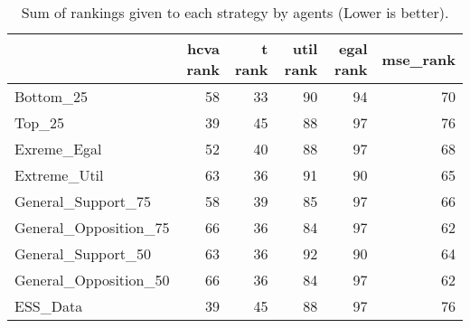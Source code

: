 \begin{table}
\caption{Sum of rankings given to each strategy by agents (Lower is better).}
\begin{tabular}{lrrrrr}
\toprule
 & hcva rank & t rank & util rank & egal rank & mse_rank \\
\midrule
Bottom_25 & 58 & 33 & 90 & 94 & 70 \\
Top_25 & 39 & 45 & 88 & 97 & 76 \\
Exreme_Egal & 52 & 40 & 88 & 97 & 68 \\
Extreme_Util & 63 & 36 & 91 & 90 & 65 \\
General_Support_75 & 58 & 39 & 85 & 97 & 66 \\
General_Opposition_75 & 66 & 36 & 84 & 97 & 62 \\
General_Support_50 & 63 & 36 & 92 & 90 & 64 \\
General_Opposition_50 & 66 & 36 & 84 & 97 & 62 \\
ESS_Data & 39 & 45 & 88 & 97 & 76 \\
\bottomrule
\end{tabular}
\end{table}
